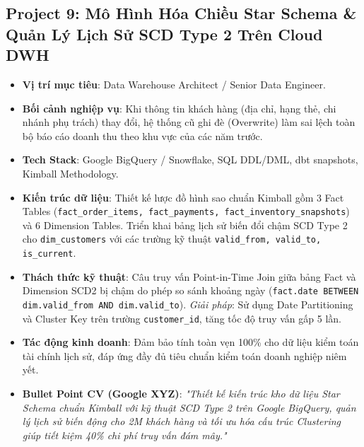 \subsection{Project 9: Mô Hình Hóa Chiều Star Schema \& Quản Lý Lịch Sử SCD Type 2 Trên Cloud DWH}
\begin{itemize}
    \item \textbf{Vị trí mục tiêu}: Data Warehouse Architect / Senior Data Engineer.
    \item \textbf{Bối cảnh nghiệp vụ}: Khi thông tin khách hàng (địa chỉ, hạng thẻ, chi nhánh phụ trách) thay đổi, hệ thống cũ ghi đè (Overwrite) làm sai lệch toàn bộ báo cáo doanh thu theo khu vực của các năm trước.
    \item \textbf{Tech Stack}: Google BigQuery / Snowflake, SQL DDL/DML, dbt snapshots, Kimball Methodology.
    \item \textbf{Kiến trúc dữ liệu}: Thiết kế lược đồ hình sao chuẩn Kimball gồm 3 Fact Tables (\texttt{fact\_order\_items, fact\_payments, fact\_inventory\_snapshots}) và 6 Dimension Tables. Triển khai bảng lịch sử biến đổi chậm SCD Type 2 cho \texttt{dim\_customers} với các trường kỹ thuật \texttt{valid\_from, valid\_to, is\_current}.
    \item \textbf{Thách thức kỹ thuật}: Câu truy vấn Point-in-Time Join giữa bảng Fact và Dimension SCD2 bị chậm do phép so sánh khoảng ngày (\texttt{fact.date BETWEEN dim.valid\_from AND dim.valid\_to}). \textit{Giải pháp}: Sử dụng Date Partitioning và Cluster Key trên trường \texttt{customer\_id}, tăng tốc độ truy vấn gấp 5 lần.
    \item \textbf{Tác động kinh doanh}: Đảm bảo tính toàn vẹn 100\% cho dữ liệu kiểm toán tài chính lịch sử, đáp ứng đầy đủ tiêu chuẩn kiểm toán doanh nghiệp niêm yết.
    \item \textbf{Bullet Point CV (Google XYZ)}: \textit{"Thiết kế kiến trúc kho dữ liệu Star Schema chuẩn Kimball với kỹ thuật SCD Type 2 trên Google BigQuery, quản lý lịch sử biến động cho 2M khách hàng và tối ưu hóa cấu trúc Clustering giúp tiết kiệm 40\% chi phí truy vấn đám mây."}
\end{itemize}

